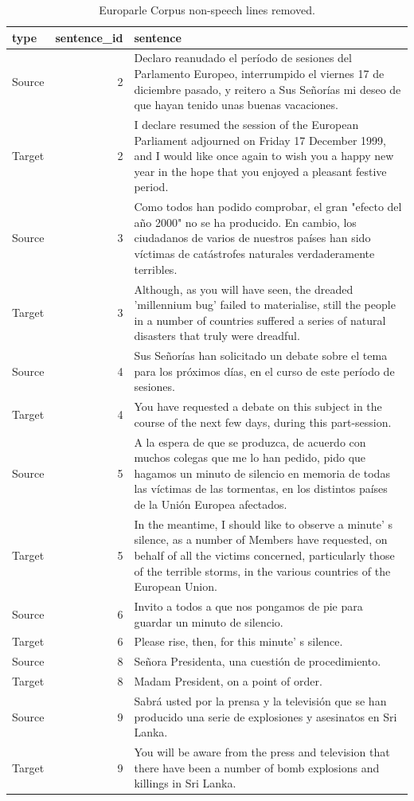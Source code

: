 \documentclass[
  letterpaper,
]{latex/krantz}
\begin{document}
\hypertarget{tbl-td-europarle-preview-2}{}
\begin{table}
\caption{\label{tbl-td-europarle-preview-2}Europarle Corpus non-speech lines removed. }\tabularnewline

\centering
\begin{tabular}{lrl}
\toprule
type & sentence\_id & sentence\\
\midrule
Source & 2 & Declaro reanudado el período de sesiones del Parlamento Europeo, interrumpido el viernes 17 de diciembre pasado, y reitero a Sus Señorías mi deseo de que hayan tenido unas buenas vacaciones.\\
Target & 2 & I declare resumed the session of the European Parliament adjourned on Friday 17 December 1999, and I would like once again to wish you a happy new year in the hope that you enjoyed a pleasant festive period.\\
Source & 3 & Como todos han podido comprobar, el gran "efecto del año 2000" no se ha producido. En cambio, los ciudadanos de varios de nuestros países han sido víctimas de catástrofes naturales verdaderamente terribles.\\
Target & 3 & Although, as you will have seen, the dreaded 'millennium bug' failed to materialise, still the people in a number of countries suffered a series of natural disasters that truly were dreadful.\\
Source & 4 & Sus Señorías han solicitado un debate sobre el tema para los próximos días, en el curso de este período de sesiones.\\
\addlinespace
Target & 4 & You have requested a debate on this subject in the course of the next few days, during this part-session.\\
Source & 5 & A la espera de que se produzca, de acuerdo con muchos colegas que me lo han pedido, pido que hagamos un minuto de silencio en memoria de todas las víctimas de las tormentas, en los distintos países de la Unión Europea afectados.\\
Target & 5 & In the meantime, I should like to observe a minute' s silence, as a number of Members have requested, on behalf of all the victims concerned, particularly those of the terrible storms, in the various countries of the European Union.\\
Source & 6 & Invito a todos a que nos pongamos de pie para guardar un minuto de silencio.\\
Target & 6 & Please rise, then, for this minute' s silence.\\
\addlinespace
Source & 8 & Señora Presidenta, una cuestión de procedimiento.\\
Target & 8 & Madam President, on a point of order.\\
Source & 9 & Sabrá usted por la prensa y la televisión que se han producido una serie de explosiones y asesinatos en Sri Lanka.\\
Target & 9 & You will be aware from the press and television that there have been a number of bomb explosions and killings in Sri Lanka.\\
\bottomrule
\end{tabular}
\end{table}
\end{document}

